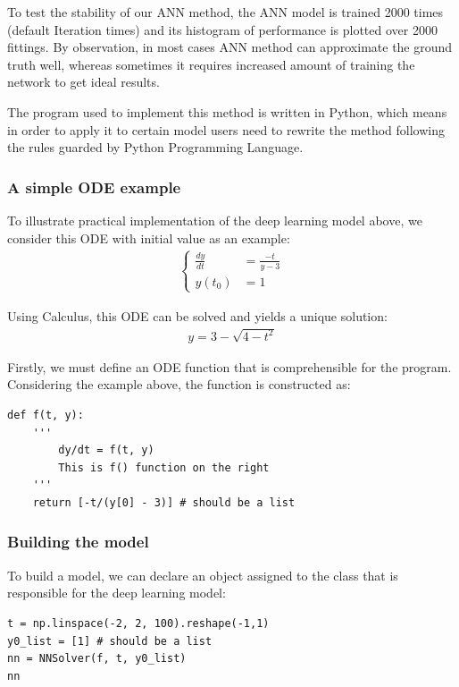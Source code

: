 \documentclass[a4paper]{article}
\numberwithin{equation}{section}
\begin{document}
To test the stability of our ANN method, the ANN model is trained 2000 times (default Iteration times) and its histogram of performance is plotted over 2000 fittings. By observation, in most cases ANN method can approximate the ground truth well, whereas sometimes it requires increased amount of training the network to get ideal results.

The program used to implement this method is written in Python, which means in order to apply it to certain model users need to rewrite the method following the rules guarded by Python Programming Language.

\subsubsection{A simple ODE example}
To illustrate practical implementation of the deep learning model above, we consider this ODE with initial value as an example:
\begin{align*}
  \begin{cases}
    \frac{dy}{dt} & = \frac{-t}{y - 3} \\
    y(t_0)        & = 1
  \end{cases}
\end{align*}

Using Calculus, this ODE can be solved and yields a unique solution:
\begin{align}
  y = 3 - \sqrt{4-t^2}
\end{align}

Firstly, we must define an ODE function that is comprehensible for the program. Considering the example above, the function is constructed as:
\begin{mdframed}[leftline=false,rightline=false,backgroundcolor=magenta!10,nobreak=true]
  \begin{verbatim}
def f(t, y):
    '''
        dy/dt = f(t, y)
        This is f() function on the right
    '''
    return [-t/(y[0] - 3)] # should be a list
  \end{verbatim}
\end{mdframed}

\subsubsection{Building the model}
To build a model, we can declare an object assigned to the class that is responsible for the deep learning model:
\begin{mdframed}[leftline=false,rightline=false,backgroundcolor=magenta!10,nobreak=true]
  \begin{verbatim}
t = np.linspace(-2, 2, 100).reshape(-1,1)
y0_list = [1] # should be a list
nn = NNSolver(f, t, y0_list)
nn
  \end{verbatim}
\end{mdframed}
\end{document}

